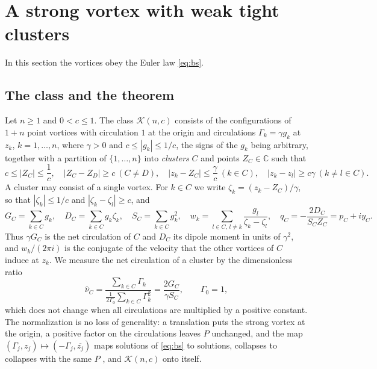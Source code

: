 \documentclass[11pt]{article}
\theoremstyle{definition}
\newcommand{\C}{\mathbb{C}}
\newcommand{\K}{\mathcal{K}}
\newcommand{\hnu}{\widehat{\nu}}
\begin{document}
\section{A strong vortex with weak tight clusters}\label{sec:clusters}

In this section the vortices obey the Euler law \eqref{eq:bs}.

\subsection{The class and the theorem}

Let $n \ge 1$ and $0 < c \le 1$. The class $\K(n, c)$ consists of the configurations of $1 + n$ point vortices with circulation $1$ at the origin and circulations $\Gamma_k = \gamma g_k$ at $z_k$, $k = 1, \ldots, n$, where $\gamma > 0$ and $c \le |g_k| \le 1/c$, the signs of the $g_k$ being arbitrary, together with a partition of $\{1, \ldots, n\}$ into \emph{clusters} $C$ and points $Z_C \in \C$ such that
\begin{equation}\label{eq:class}
  c \le |Z_C| \le \frac{1}{c}, \quad |Z_C - Z_D| \ge c \ (C \ne D), \quad |z_k - Z_C| \le \frac{\gamma}{c} \ (k \in C), \quad |z_k - z_l| \ge c\gamma \ (k \ne l \in C).
\end{equation}
A cluster may consist of a single vortex. For $k \in C$ we write $\zeta_k = (z_k - Z_C)/\gamma$, so that $|\zeta_k| \le 1/c$ and $|\zeta_k - \zeta_l| \ge c$, and
\[
  G_C = \sum_{k \in C} g_k, \quad D_C = \sum_{k \in C} g_k\zeta_k, \quad S_C = \sum_{k \in C} g_k^2, \quad w_k = \sum_{l \in C,\, l \ne k} \frac{g_l}{\zeta_k - \zeta_l}, \quad q_C = -\frac{2D_C}{S_C Z_C} = p_C + iy_C .
\]
Thus $\gamma G_C$ is the net circulation of $C$ and $D_C$ its dipole moment in units of $\gamma^2$, and $w_k/(2\pi i)$ is the conjugate of the velocity that the other vortices of $C$ induce at $z_k$. We measure the net circulation of a cluster by the dimensionless ratio
\[
  \hnu_C = \frac{\sum_{k \in C} \Gamma_k}{\frac{1}{2\Gamma_0}\sum_{k \in C} \Gamma_k^2} = \frac{2G_C}{\gamma S_C}, \qquad \Gamma_0 = 1 ,
\]
which does not change when all circulations are multiplied by a positive constant. The normalization is no loss of generality: a translation puts the strong vortex at the origin, a positive factor on the circulations leaves $P$ unchanged, and the map $(\Gamma_j, z_j) \mapsto (-\Gamma_j, \overline{z_j})$ maps solutions of \eqref{eq:bs} to solutions, collapses to collapses with the same $P$ \cite[Sect.~3.1]{mw2026}, and $\K(n, c)$ onto itself.
\end{document}
